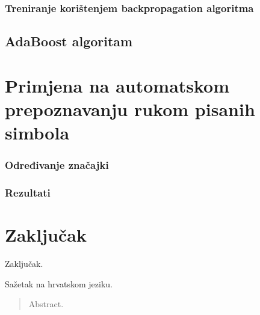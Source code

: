 \documentclass[times, utf8, zavrsni, numeric]{fer}
\begin{document}
\subsection{Treniranje korištenjem backpropagation algoritma}

\section{AdaBoost algoritam}


\chapter{Primjena na automatskom prepoznavanju rukom pisanih simbola}
\subsection{Određivanje značajki}
\subsection{Rezultati}

\chapter{Zaključak}
Zaključak.





\begin{sazetak}
Sažetak na hrvatskom jeziku.

\end{sazetak}

\begin{abstract}
Abstract.

\end{abstract}
\end{document}
